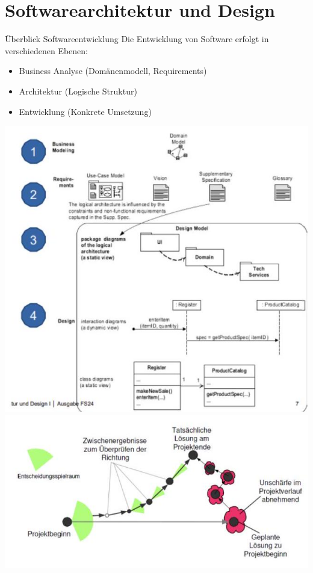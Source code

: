 \section{Softwarearchitektur und Design}

\begin{concept}{Überblick Softwareentwicklung}
Die Entwicklung von Software erfolgt in verschiedenen Ebenen:
\begin{itemize}
    \item Business Analyse (Domänenmodell, Requirements)
    \item Architektur (Logische Struktur)
    \item Entwicklung (Konkrete Umsetzung)
\end{itemize}
\includegraphics[width=0.9\linewidth]{images/2024_12_29_0d1d7b5551ea1b4b41bdg-07(2)}
\includegraphics[width=0.9\linewidth]{images/2024_12_29_0d1d7b5551ea1b4b41bdg-08(1)}
\end{concept}

